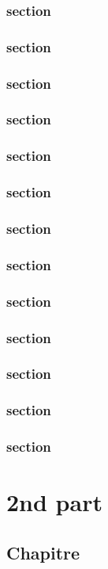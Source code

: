 \documentclass[11pt,table]{book}
\begin{document}
\section{section}
\section{section}
\section{section}
\section{section}
\section{section}
\section{section}
\section{section}
\section{section}
\section{section}
\section{section}
\section{section}
\section{section}
\section{section}

\part{2nd part}
\chapter{Chapitre}
\end{document}
